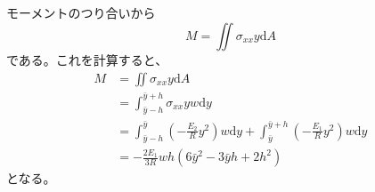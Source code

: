 \documentclass[a4paper]{jsarticle}
\begin{document}
\subsection{}
モーメントのつり合いから
\begin{equation}
  M = \iint \sigma_{xx} y \mathrm{d} A
\end{equation}
である。これを計算すると、
\begin{equation}
  \begin{aligned}
    M &= \iint \sigma_{xx} y \mathrm{d} A \\
    &= \int_{\bar{y} - h}^{\bar{y} + h} \sigma_{xx} y w \mathrm{d} y \\
    &= \int_{\bar{y} - h}^{\bar{y}} \left(-\frac{E_2}{R} y^2\right) w \mathrm{d} y
    + \int_{\bar{y}}^{\bar{y} + h} \left(-\frac{E_1}{R} y^2\right) w \mathrm{d} y \\
    &= - \frac{2 E_1}{3 R} w h (6 \bar{y}^2 - 3 \bar{y} h + 2 h^2)
  \end{aligned}
\end{equation}
となる。
\end{document}
